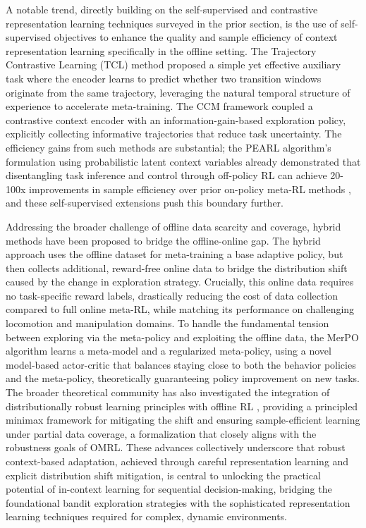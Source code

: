 \documentclass[11pt]{article}
\begin{document}
A notable trend, directly building on the self-supervised and contrastive representation learning techniques surveyed in the prior section, is the use of self-supervised objectives to enhance the quality and sample efficiency of context representation learning specifically in the offline setting. The Trajectory Contrastive Learning (TCL) method \cite{ref318} proposed a simple yet effective auxiliary task where the encoder learns to predict whether two transition windows originate from the same trajectory, leveraging the natural temporal structure of experience to accelerate meta-training. The CCM framework \cite{ref310} coupled a contrastive context encoder with an information-gain-based exploration policy, explicitly collecting informative trajectories that reduce task uncertainty. The efficiency gains from such methods are substantial; the PEARL algorithm's formulation using probabilistic latent context variables already demonstrated that disentangling task inference and control through off-policy RL can achieve 20-100x improvements in sample efficiency over prior on-policy meta-RL methods \cite{ref333}, and these self-supervised extensions push this boundary further.

Addressing the broader challenge of offline data scarcity and coverage, hybrid methods have been proposed to bridge the offline-online gap. The hybrid approach \cite{ref341} uses the offline dataset for meta-training a base adaptive policy, but then collects additional, reward-free online data to bridge the distribution shift caused by the change in exploration strategy. Crucially, this online data requires no task-specific reward labels, drastically reducing the cost of data collection compared to full online meta-RL, while matching its performance on challenging locomotion and manipulation domains. To handle the fundamental tension between exploring via the meta-policy and exploiting the offline data, the MerPO algorithm \cite{ref342} learns a meta-model and a regularized meta-policy, using a novel model-based actor-critic that balances staying close to both the behavior policies and the meta-policy, theoretically guaranteeing policy improvement on new tasks. The broader theoretical community has also investigated the integration of distributionally robust learning principles with offline RL \cite{ref343}, providing a principled minimax framework for mitigating the shift and ensuring sample-efficient learning under partial data coverage, a formalization that closely aligns with the robustness goals of OMRL. These advances collectively underscore that robust context-based adaptation, achieved through careful representation learning and explicit distribution shift mitigation, is central to unlocking the practical potential of in-context learning for sequential decision-making, bridging the foundational bandit exploration strategies with the sophisticated representation learning techniques required for complex, dynamic environments.
\end{document}
